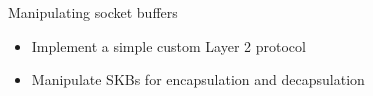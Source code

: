 \setuplabframe
{Manipulating socket buffers}
{
  \begin{itemize}
  \item Implement a simple custom Layer 2 protocol
  \item Manipulate SKBs for encapsulation and decapsulation
  \end{itemize}
}
